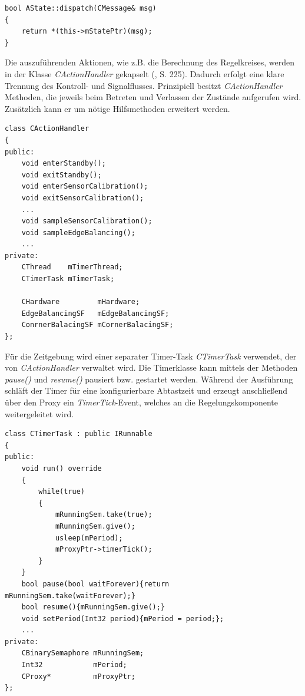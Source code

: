 \begin{lstlisting}[caption={Defintion der \textit{dispatch()}-Methode},captionpos=b]
bool AState::dispatch(CMessage& msg)
{
	return *(this->mStatePtr)(msg);
}
\end{lstlisting} 

Die auszuführenden Aktionen, wie z.B. die Berechnung des Regelkreises, werden in der Klasse \textit{CActionHandler} gekapselt (\cite{Wietzke1}, S. 225). Dadurch erfolgt eine klare Trennung des Kontroll- und Signalflusses. Prinzipiell besitzt \textit{CActionHandler} Methoden, die jeweils beim Betreten und Verlassen der Zustände aufgerufen wird. Zusätzlich kann er um nötige Hilfsmethoden erweitert werden.
\begin{lstlisting}[caption={Beispielhafte Implementierung des Actionhandlers},captionpos=b]
class CActionHandler
{
public:
	void enterStandby();
	void exitStandby();
	void enterSensorCalibration();
	void exitSensorCalibration();
	...
	void sampleSensorCalibration();
	void sampleEdgeBalancing();
	...
private:
	CThread    mTimerThread;
	CTimerTask mTimerTask;
	
	CHardware         mHardware;
	EdgeBalancingSF   mEdgeBalancingSF;
	ConrnerBalacingSF mCornerBalacingSF;
};
\end{lstlisting}
Für die Zeitgebung wird einer separater Timer-Task \textit{CTimerTask} verwendet, der von \textit{CActionHandler} verwaltet wird. Die Timerklasse kann mittels der Methoden \textit{pause()} und \textit{resume()} pausiert bzw. gestartet werden. Während der Ausführung schläft der Timer für eine konfigurierbare Abtastzeit und erzeugt anschließend über den Proxy ein \textit{TimerTick}-Event, welches an die Regelungskomponente weitergeleitet wird.
\begin{lstlisting}[caption={Aufbau des Timer-Tasks},captionpos=b]
class CTimerTask : public IRunnable
{
public:
	void run() override
	{
		while(true)
		{
			mRunningSem.take(true);
			mRunningSem.give();
			usleep(mPeriod);
			mProxyPtr->timerTick();
		}
	}
	bool pause(bool waitForever){return mRunningSem.take(waitForever);}
	bool resume(){mRunningSem.give();}
	void setPeriod(Int32 period){mPeriod = period;};
	...
private:
	CBinarySemaphore mRunningSem;
	Int32            mPeriod;
	CProxy*          mProxyPtr;
};
\end{lstlisting}
